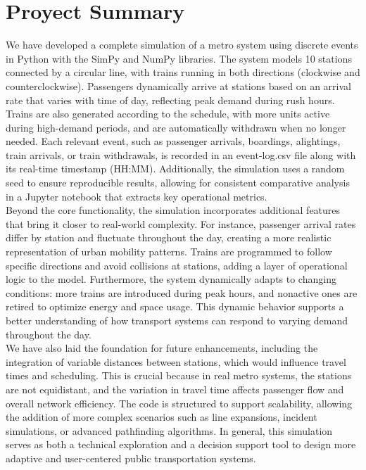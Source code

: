 \documentclass[a4paper,11pt,oneside]{book}
\begin{document}
    \newpage
    \thispagestyle{empty}
    \chapter*{\centering \Large Proyect Summary}


     We have developed a complete simulation of a metro system using discrete events in Python with the SimPy and NumPy libraries. The system models 10 stations connected by a circular line, with trains running in both directions (clockwise and counterclockwise). Passengers dynamically arrive at stations based on an arrival rate that varies with time of day, reflecting peak demand during rush hours. Trains are also generated according to the schedule, with more units active during high-demand periods, and are automatically withdrawn when no longer needed. Each relevant event, such as passenger arrivals, boardings, alightings, train arrivals, or train withdrawals, is recorded in an event-log.csv file along with its real-time timestamp (HH:MM). Additionally, the simulation uses a random seed to ensure reproducible results, allowing for consistent comparative analysis in a Jupyter notebook that extracts key operational metrics. 
    ~\\[0,5cm]
     Beyond the core functionality, the simulation incorporates additional features that bring it closer to real-world complexity. For instance, passenger arrival rates differ by station and fluctuate throughout the day, creating a more realistic representation of urban mobility patterns. Trains are programmed to follow specific directions and avoid collisions at stations, adding a layer of operational logic to the model. Furthermore, the system dynamically adapts to changing conditions: more trains are introduced during peak hours, and nonactive ones are retired to optimize energy and space usage. This dynamic behavior supports a better understanding of how transport systems can respond to varying demand throughout the day. 
     ~\\[0,5cm]
     We have also laid the foundation for future enhancements, including the integration of variable distances between stations, which would influence travel times and scheduling. This is crucial because in real metro systems, the stations are not equidistant, and the variation in travel time affects passenger flow and overall network efficiency. The code is structured to support scalability, allowing the addition of more complex scenarios such as line expansions, incident simulations, or advanced pathfinding algorithms. In general, this simulation serves as both a technical exploration and a decision support tool to design more adaptive and user-centered public transportation systems.\\
\end{document}
